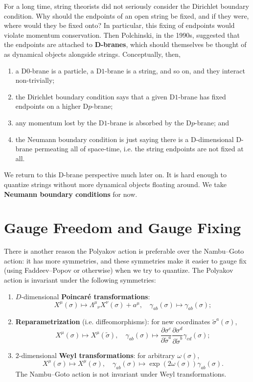\documentclass{report}
\theoremstyle{plain}
\theoremstyle{definition}
\theoremstyle{remark}
\newcommand{\pder}[2]{\frac{\partial #1}{\partial #2}}
\begin{document}
For a long time, string theorists did not seriously consider the
Dirichlet boundary condition. Why should the endpoints of an open
string be fixed, and if they were, where would they be fixed onto? In
particular, this fixing of endpoints would violate momentum
conservation. Then Polchinski, in the 1990s, suggested that the
endpoints are attached to {\bf D-branes}, which should themselves be
thought of as dynamical objects alongside strings. Conceptually, then,
\begin{enumerate}
\item a D$0$-brane is a particle, a D$1$-brane is a string, and so on,
  and they interact non-trivially;
\item the Dirichlet boundary condition says that a given D$1$-brane
  has fixed endpoints on a higher D$p$-brane;
\item any momentum lost by the D$1$-brane is absorbed by the
  D$p$-brane; and
\item the Neumann boundary condition is just saying there is a
  D-dimensional D-brane permeating all of space-time, i.e. the string
  endpoints are not fixed at all.
\end{enumerate}
We return to this D-brane perspective much later on. It is hard enough
to quantize strings without more dynamical objects floating around. We
take {\bf Neumann boundary conditions} for now.

\section{Gauge Freedom and Gauge Fixing}

There is another reason the Polyakov action is preferable over the
Nambu--Goto action: it has more symmetries, and these symmetries make
it easier to gauge fix (using Faddeev--Popov or otherwise) when we try
to quantize. The Polyakov action is invariant under the following
symmetries:
\begin{enumerate}
\item $D$-dimensional {\bf Poincar\'e transformations}:
  \[ X^\mu(\sigma) \mapsto \Lambda^\mu{}_\nu X^\nu(\sigma) + a^\mu, \quad \gamma_{ab}(\sigma) \mapsto \gamma_{ab}(\sigma); \]
\item {\bf Reparametrization} (i.e. diffeomorphisms): for new
  coordinates $\tilde{\sigma}^a(\sigma)$,
  \[ X^\mu(\sigma) \mapsto X^\mu(\tilde{\sigma}), \quad \gamma_{ab}(\sigma) \mapsto \pder{\sigma^c}{\tilde{\sigma}^a} \pder{\sigma^d}{\tilde{\sigma}^b} \gamma_{cd}(\sigma); \]
\item $2$-dimensional {\bf Weyl transformations}: for arbitrary
  $\omega(\sigma)$,
  \[ X^\mu(\sigma) \mapsto X^\mu(\sigma), \quad \gamma_{ab}(\sigma) \mapsto \exp(2\omega(\sigma)) \gamma_{ab}(\sigma). \]
  The Nambu--Goto action is not invariant under Weyl transformations.
\end{enumerate}
\end{document}
